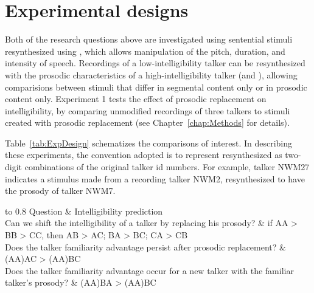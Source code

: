 \section{Experimental designs}
Both of the research questions above are investigated using sentential stimuli resynthesized using \psola{} \citep{MoulinesCharpentier1990}, which allows manipulation of the pitch, duration, and intensity of speech.  Recordings of a low-intelligibility talker can be resynthesized with the prosodic characteristics of a high-intelligibility talker (and \vv), allowing comparisions between stimuli that differ in segmental content only or in prosodic content only.  Experiment 1 tests the effect of prosodic replacement on intelligibility, by comparing unmodified recordings of three talkers to stimuli created with prosodic replacement (see Chapter~\ref{chap:Methods} for details).

Table~\ref{tab:ExpDesign} schematizes the comparisons of interest.  In describing these experiments, the convention adopted is to represent resynthesized  as two-digit combinations of the original talker \ac{id} numbers.  For example, talker NWM27 indicates a stimulus made from a recording talker NWM2, resynthesized to have the prosody of talker NWM7.     
 

\begin{table}
	\caption[Experimental design schema]{Schematic table of stimulus types and comparisons for the three experiments described in this thesis.  In this schematic, the original talkers are represented by combinations of the letters A, B, and C, with the first letter indicating the  and the second letter indicating the  of the resynthesized tokens (talkers AA, BB, and CC represent the original, unmodified recordings).  For experiments involving training, the talker used for training is indicated in (parentheses) preceding the test talker.\label{tab:ExpDesign}}
	\centering
	\begin{tabu} to 0.8\textwidth {XXX}
		\toprule
		\rowfont[c]{\bfseries} Question & Intelligibility prediction \\
		\midrule
		Can we shift the intelligibility of a talker by replacing his prosody?                           & if AA > BB > CC, then AB > AC; BA > BC; CA > CB \\
		Does the talker familiarity advantage persist after prosodic replacement?                        & (AA)AC > (AA)BC \\
		Does the talker familiarity advantage occur for a new talker with the familiar talker’s prosody? & (AA)BA > (AA)BC \\ 
		\bottomrule
	\end{tabu}
\end{table}


